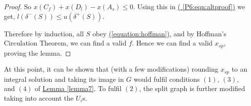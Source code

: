 \documentclass[./main.tex]{subfiles}
\begin{document}
\begin{proof}
			So $x(C_f) + x(D_l) - x(A_s) \leqslant 0$. Using this in \hyperref[P6:eqn:altproof]{( \ref{P6:eqn:altproof})} we get, $l(\delta^-(S)) \leqslant u(\delta^+(S))$.

			Therefore by induction, all $S$ obey \hyperref[equation:hoffman]{(\ref{equation:hoffman})}, and by Hoffman's Circulation Theorem, we can find a valid $f$. Hence we can find a valid $x_{sp}$, proving the lemma.
	\end{proof}
	\vspace{5mm}

		At this point, it can be shown that (with a few modifications) rounding $x_{sp}$ to an integral solution and taking its image in $G$ would fulfil conditions $(1)$, $(3)$, and $(4)$ of \hyperref[lemma7]{Lemma \ref{lemma7}}. To fulfil $(2)$, the split graph is further modified taking into account the $U_i$s.\\
		\vspace{2mm}
\end{document}
